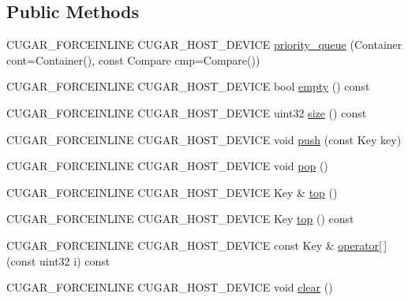 \subsection*{Public Methods}
\begin{DoxyCompactItemize}
\item 
C\+U\+G\+A\+R\+\_\+\+F\+O\+R\+C\+E\+I\+N\+L\+I\+NE C\+U\+G\+A\+R\+\_\+\+H\+O\+S\+T\+\_\+\+D\+E\+V\+I\+CE \hyperlink{structcugar_1_1priority__queue_ac27881d03a273accfa84ddf946c0466b}{priority\+\_\+queue} (Container cont=Container(), const Compare cmp=Compare())
\item 
C\+U\+G\+A\+R\+\_\+\+F\+O\+R\+C\+E\+I\+N\+L\+I\+NE C\+U\+G\+A\+R\+\_\+\+H\+O\+S\+T\+\_\+\+D\+E\+V\+I\+CE bool \hyperlink{structcugar_1_1priority__queue_aa7c04643a12d912dfada807743a8c1a8}{empty} () const
\item 
C\+U\+G\+A\+R\+\_\+\+F\+O\+R\+C\+E\+I\+N\+L\+I\+NE C\+U\+G\+A\+R\+\_\+\+H\+O\+S\+T\+\_\+\+D\+E\+V\+I\+CE uint32 \hyperlink{structcugar_1_1priority__queue_aa75b22d30695f86f47dba642f44a4774}{size} () const
\item 
C\+U\+G\+A\+R\+\_\+\+F\+O\+R\+C\+E\+I\+N\+L\+I\+NE C\+U\+G\+A\+R\+\_\+\+H\+O\+S\+T\+\_\+\+D\+E\+V\+I\+CE void \hyperlink{structcugar_1_1priority__queue_a4772719e001bba3c9ac2c02f4b12ba83}{push} (const Key key)
\item 
C\+U\+G\+A\+R\+\_\+\+F\+O\+R\+C\+E\+I\+N\+L\+I\+NE C\+U\+G\+A\+R\+\_\+\+H\+O\+S\+T\+\_\+\+D\+E\+V\+I\+CE void \hyperlink{structcugar_1_1priority__queue_aedb3ffb12d8f0d8515715235e7b518ae}{pop} ()
\item 
C\+U\+G\+A\+R\+\_\+\+F\+O\+R\+C\+E\+I\+N\+L\+I\+NE C\+U\+G\+A\+R\+\_\+\+H\+O\+S\+T\+\_\+\+D\+E\+V\+I\+CE Key \& \hyperlink{structcugar_1_1priority__queue_ae74971b0d5b9ed6d0822601ba8afc875}{top} ()
\item 
C\+U\+G\+A\+R\+\_\+\+F\+O\+R\+C\+E\+I\+N\+L\+I\+NE C\+U\+G\+A\+R\+\_\+\+H\+O\+S\+T\+\_\+\+D\+E\+V\+I\+CE Key \hyperlink{structcugar_1_1priority__queue_a1c4ec8611f6fe2e6dbfdae408435b9cd}{top} () const
\item 
C\+U\+G\+A\+R\+\_\+\+F\+O\+R\+C\+E\+I\+N\+L\+I\+NE C\+U\+G\+A\+R\+\_\+\+H\+O\+S\+T\+\_\+\+D\+E\+V\+I\+CE const Key \& \hyperlink{structcugar_1_1priority__queue_aaa3d4e418725e5c5442382b007f4bc13}{operator\mbox{[}$\,$\mbox{]}} (const uint32 i) const
\item 
C\+U\+G\+A\+R\+\_\+\+F\+O\+R\+C\+E\+I\+N\+L\+I\+NE C\+U\+G\+A\+R\+\_\+\+H\+O\+S\+T\+\_\+\+D\+E\+V\+I\+CE void \hyperlink{structcugar_1_1priority__queue_ae83fdf473503faff06093363f2fbd9de}{clear} ()
\item 

\end{DoxyCompactItemize}
